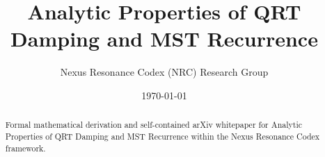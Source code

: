 \documentclass[11pt,a4paper]{article}
\title{Analytic Properties of QRT Damping and MST Recurrence}
\author{Nexus Resonance Codex (NRC) Research Group}
\date{\today}
\begin{document}
\maketitle

\begin{abstract}
Formal mathematical derivation and self-contained arXiv whitepaper for Analytic Properties of QRT Damping and MST Recurrence within the Nexus Resonance Codex framework.
\end{abstract}





\end{document}
